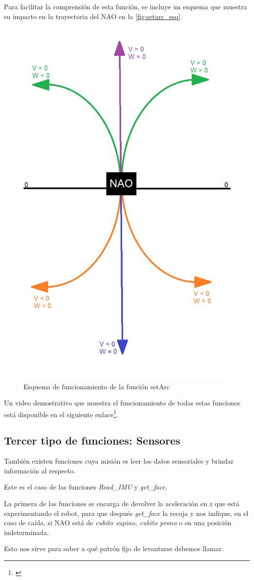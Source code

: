 Para facilitar la comprensión de esta función, se incluye un esquema que muestra su impacto en la trayectoria del NAO en la \autoref{fig:setarc_esq}.

\begin{figure}[H]
  \centering
  \includegraphics[height=0.8\textwidth]{figures/cap_4/esquema_movs.jpeg}
  \caption{Esquema de funcionamiento de la función setArc}
  \label{fig:setarc_esq}
\end{figure}

Un video demostrativo que muestra el funcionamiento de todas estas funciones está disponible en el siguiente enlace\footnote{\url{}}.

\subsection{Tercer tipo de funciones: Sensores} \label{subsec:sensores}

También existen funciones cuya misión es leer los datos sensoriales y brindar información al respecto.

Este es el caso de las funciones \textit{Read\_IMU} y \textit{get\_face}.

La primera de las funciones se encarga de devolver la aceleración en z que está experimentando el robot, para que después \textit{get\_face} la recoja y nos indique, en el caso de caída, si NAO está de \textit{cubito supino, cubito prono} o en una posición indeterminada.

Esto nos sirve para saber a qué patrón fijo de levantarse debemos llamar.


